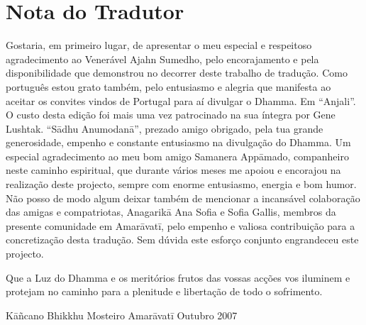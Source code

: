 \chapter{Nota do Tradutor}

Gostaria, em primeiro lugar, de apresentar o meu especial
e respeitoso agradecimento ao Venerável Ajahn Sumedho, pelo
encorajamento e pela disponibilidade que demonstrou no
decorrer deste trabalho de tradução. Como português estou
grato também, pelo entusiasmo e alegria que manifesta ao
aceitar os convites vindos de Portugal para aí divulgar o
Dhamma. Em “Anjali”.
O custo desta edição foi mais uma vez patrocinado na sua
íntegra por Gene Lushtak. “Sādhu Anumodanā”, prezado
amigo obrigado, pela tua grande generosidade, empenho e
constante entusiasmo na divulgação do Dhamma.
Um especial agradecimento ao meu bom amigo
Samanera Appāmado, companheiro neste caminho espiritual,
que durante vários meses me apoiou e encorajou na realização deste projecto, sempre com enorme entusiasmo, energia e
bom humor.
Não posso de modo algum deixar também de mencionar a
incansável colaboração das amigas e compatriotas, Anagarikā
Ana Sofia e Sofia Gallis, membros da presente comunidade em
Amarāvatī, pelo empenho e valiosa contribuição para a concretização desta tradução. Sem dúvida este esforço conjunto
engrandeceu este projecto.

Que a Luz do Dhamma e os meritórios frutos das vossas
acções vos iluminem e protejam no caminho para a plenitude
e libertação de todo o sofrimento.

Kāñcano Bhikkhu
Mosteiro Amarāvatī
Outubro 2007